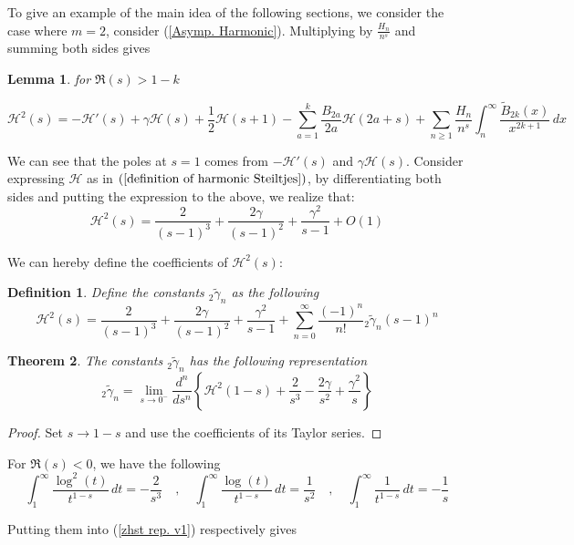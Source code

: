 \documentclass{article}
\newcommand{\Hz}[1]{\mathcal{H}(#1)}
\newcommand{\pHz}[2]{\mathcal{H}^{#1}(#2)}
\newcommand{\zHSt}[1]{{}_2\tilde{\gamma}_{#1}}
\newtheorem{theorem}{Theorem}
\newtheorem{lemma}[theorem]{Lemma}%
\newtheorem{definition}{Definition}%
\begin{document}
To give an example of the main idea of the following sections, we consider the case where $m=2$, consider (\ref{Asymp. Harmonic}). Multiplying by $\frac{H_n}{n^s}$ and summing both sides gives
\begin{lemma} for $\Re (s) >1- k$
 
\begin{equation}\label{EM of H2 v1}
    \pHz{2}{s}=-\mathcal{H}'(s)+\gamma \mathcal{H}(s)+\frac{1}{2}\Hz{s+1}-\sum_{a=1}^k \frac{B_{2a}}{2a} \Hz{2a+s} +\sum_{n\geq 1}\frac{H_n}{n^s}\int_n^{\infty} \frac{\tilde B_{2k}(x)}{x^{2k+1}}\, dx
\end{equation}
   
\end{lemma}
We can see that the poles at $s=1$ comes from $-\mathcal{H}'(s)$ and $\gamma \mathcal{H}(s)$. Consider expressing $\mathcal H$ as in $(\ref{definition of harmonic Steiltjes})$, by differentiating both sides and putting the expression to the above, we realize that:
\begin{equation}\label{Lau. expansion of H2}
    \pHz{2}{s}=\frac{2}{(s-1)^3} +\frac{2\gamma}{(s-1)^2}+\frac{\gamma^2}{s-1}+O(1)
\end{equation}

We can hereby define the coefficients of $\pHz{2}{s}$:

\begin{definition}
    Define the constants $\zHSt{n}$ as the following
    \[\pHz{2}{s}=\frac{2}{(s-1)^3} +\frac{2\gamma}{(s-1)^2}+\frac{\gamma^2}{s-1}+\sum_{n=0}^{\infty} \frac{(-1)^n}{n!}\zHSt{n}(s-1)^n\]
\end{definition}

\begin{theorem} The constants $\zHSt{n}$ has the following representation
    \begin{equation}\label{zhst rep. v1}
   \zHSt{n}=\lim_{s\to 0^-}\frac{d^n}{ds^n}\left\{\pHz{2}{1-s}+\frac{2}{s^3}-\frac{2\gamma}{s^2}+\frac{\gamma^2}{s}\right\} \end{equation}
\end{theorem}
\begin{proof}
    Set $s\to 1-s$ and use the coefficients of its Taylor series.
\end{proof}
    For $\Re(s)<0$, we have the following
    \[\int_1^{\infty} \frac{\log^2(t)}{t^{1-s}}\, dt=-\frac{2}{s^3}\quad , \quad \int_1^{\infty}\frac{\log(t)}{t^{1-s}}\, dt=\frac{1}{s^2} \quad ,\quad \int_1^{\infty}\frac{1}{t^{1-s}}\, dt=-\frac{1}{s}\]

Putting them into (\ref{zhst rep. v1}) respectively gives
\end{document}
